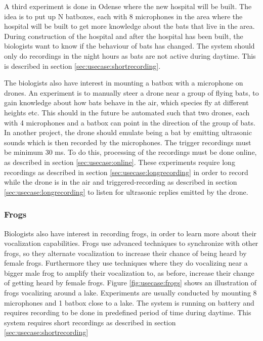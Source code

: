 A third experiment is done in Odense where the new hospital will be built.
The idea is to put up N batboxes, each with 8 microphones in the area where the hospital will be built to get more knowledge about the bats that live in the area. During construction of the hospital and after the hospital has been built, the biologists want to know if the behaviour of bats has changed. The system should only do recordings in the night hours as bats are not active during daytime. This is described in section \ref{sec:usecase:shortrecording}.


The biologists also have interest in mounting a batbox with a microphone on drones. An experiment is to manually steer a drone near a group of flying bats, to gain knowledge about how bats behave in the air, which species fly at different heights etc. This should in the future be automated such that two drones, each with 4 microphones and a batbox can point in the direction of the group of bats.
In another project, the drone should emulate being a bat by emitting ultrasonic sounds which is then recorded by the microphones. The trigger recordings must be minimum 30 ms. To do this, processing of the recordings must be done online, as described in section \ref{sec:usecase:online}.
These experiments require long recordings as described in section \ref{sec:usecase:longrecording} in order to record while the drone is in the air and triggered-recording as described in section \ref{sec:usecase:longrecording} to listen for ultrasonic replies emitted by the drone.

\subsubsection{Frogs} \label{sec:usecase:frogs}
Biologists also have interest in recording frogs, in order to learn more about their vocalization capabilities. Frogs use advanced techniques to synchronize with other frogs, so they alternate vocalization to increase their chance of being heard by female frogs. Furthermore they use techniques where they do vocalizing near a bigger male frog to amplify their vocalization to, as before, increase their change of getting heard by female frogs. Figure \ref{fig:usecase:frogs} shows an illustration of frogs vocalizing around a lake. Experiments are usually conducted by mounting 8 microphones and 1 batbox close to a lake. The system is running on battery and requires recording to be done in predefined period of time during daytime. This system requires short recordings as described in section \ref{sec:usecase:shortrecording}

